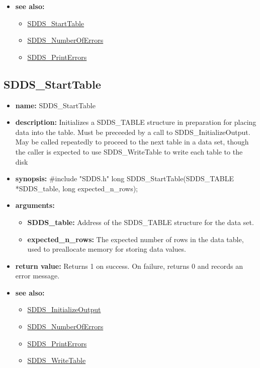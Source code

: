 \documentclass[11pt]{article}
\newcommand{\progref}[1]{\hyperref{SDDS_#1}{{\tt SDDS\_#1} (}{)}{SDDS_#1}}
\begin{document}
\begin{itemize}
\item {\bf see also:}
\begin{itemize}
\item \progref{StartTable}
\item \progref{NumberOfErrors}
\item \progref{PrintErrors}
\end{itemize}
\end{itemize}

\subsection{SDDS\_StartTable}
\label{SDDS_StartTable}

\begin{itemize}
\item {\bf name:}\newline
SDDS\_StartTable
\item {\bf description:}\newline
Initializes a SDDS\_TABLE structure in preparation for placing data into the table. Must be preceeded by a call to SDDS\_InitializeOutput. May be called repeatedly to proceed to the next table in a data set, though the caller is expected to use SDDS\_WriteTable to write each table to the disk
\item {\bf synopsis:} \#include "SDDS.h"\newline
long SDDS\_StartTable(SDDS\_TABLE *SDDS\_table, long expected\_n\_rows);
\item {\bf arguments:}
\begin{itemize}
\item {\bf SDDS\_table:} Address of the SDDS\_TABLE structure for the data set.
\item {\bf expected\_n\_rows:} The expected number of rows in the data table, used to preallocate memory for storing data values.
\end{itemize}
\item {\bf return value:}\newline
Returns 1 on success. On failure, returns 0 and records an error message.
\item {\bf see also:}
\begin{itemize}
\item \progref{InitializeOutput}
\item \progref{NumberOfErrors}
\item \progref{PrintErrors}
\item \progref{WriteTable}
\end{itemize}
\end{itemize}
\end{document}
